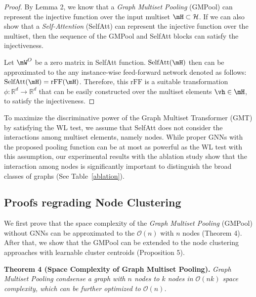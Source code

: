 \begin{proof}
By Lemma 2, we know that a \emph{Graph Multiset Pooling} (GMPool) can represent the injective function over the input multiset $\mH \subset \mathcal{H}$. If we can also show that a \emph{Self-Attention} (SelfAtt) can represent the injective function over the multiset, then the sequence of the GMPool and SelfAtt blocks can satisfy the injectiveness.

Let $\mW^O$ be a zero matrix in SelfAtt function. $\text{SelfAtt}(\mH)$ then can be approximated to the any instance-wise feed-forward network denoted as follows: $\text{SelfAtt}(\mH) = \text{rFF}(\mH)$. Therefore, this $\text{rFF}$ is a suitable transformation $\phi: \mathbb{R}^d \rightarrow \mathbb{R}^d$ that can be easily constructed over the multiset elements $\vh \in \mH$, to satisfy the injectiveness.
\end{proof}

To maximize the discriminative power of the Graph Multiset Transformer (GMT) by satisfying the WL test, we assume that SelfAtt does not consider the interactions among multiset elements, namely nodes. While proper GNNs with the proposed pooling function can be at most as powerful as the WL test with this assumption, our experimental results with the ablation study show that the interaction among nodes is significantly important to distinguish the broad classes of graphs (See Table~\ref{ablation}).


\subsection{Proofs regrading Node Clustering \label{appendix/clusterproof}}
We first prove that the space complexity of the \emph{Graph Multiset Pooling} (GMPool) without GNNs can be approximated to the $\mathcal{O}(n)$ with $n$ nodes (Theorem 4). After that, we show that the GMPool can be extended to the node clustering approaches with learnable cluster centroids (Proposition 5).


\textbf{Theorem 4 (Space Complexity of Graph Multiset Pooling).} \emph{Graph Multiset Pooling condsense a graph with $n$ nodes to $k$ nodes in $\mathcal{O}(nk)$ space complexity, which can be further optimized to $\mathcal{O}(n)$.}

